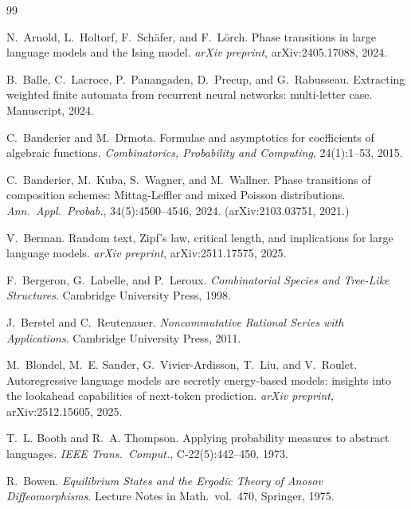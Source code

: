\begin{thebibliography}{99}

N.~Arnold, L.~Holtorf, F.~Sch\"afer, and F.~L\"orch.
\newblock Phase transitions in large language models and the Ising model.
\newblock \emph{arXiv preprint}, arXiv:2405.17088, 2024.

B.~Balle, C.~Lacroce, P.~Panangaden, D.~Precup, and G.~Rabusseau.
\newblock Extracting weighted finite automata from recurrent neural networks: multi-letter case.
\newblock Manuscript, 2024.

C.~Banderier and M.~Drmota.
\newblock Formulae and asymptotics for coefficients of algebraic functions.
\newblock \emph{Combinatorics, Probability and Computing}, 24(1):1--53, 2015.

C.~Banderier, M.~Kuba, S.~Wagner, and M.~Wallner.
\newblock Phase transitions of composition schemes: {M}ittag-{L}effler and mixed {P}oisson distributions.
\newblock \emph{Ann.\ Appl.\ Probab.}, 34(5):4500--4546, 2024.
\newblock (arXiv:2103.03751, 2021.)

V.~Berman.
\newblock Random text, {Z}ipf's law, critical length, and implications for large language models.
\newblock \emph{arXiv preprint}, arXiv:2511.17575, 2025.

F.~Bergeron, G.~Labelle, and P.~Leroux.
\newblock \emph{Combinatorial Species and Tree-Like Structures}.
\newblock Cambridge University Press, 1998.

J.~Berstel and C.~Reutenauer.
\newblock \emph{Noncommutative Rational Series with Applications}.
\newblock Cambridge University Press, 2011.

M.~Blondel, M.~E. Sander, G.~Vivier-Ardisson, T.~Liu, and V.~Roulet.
\newblock Autoregressive language models are secretly energy-based models: insights into the lookahead capabilities of next-token prediction.
\newblock \emph{arXiv preprint}, arXiv:2512.15605, 2025.

T.~L. Booth and R.~A. Thompson.
\newblock Applying probability measures to abstract languages.
\newblock \emph{IEEE Trans.\ Comput.}, C-22(5):442--450, 1973.

R.~Bowen.
\newblock \emph{Equilibrium States and the Ergodic Theory of Anosov Diffeomorphisms}.
\newblock Lecture Notes in Math.\ vol.~470, Springer, 1975.


\end{thebibliography}
